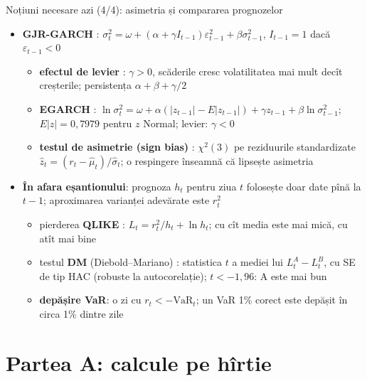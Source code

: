 \begin{frame}{Noțiuni necesare azi (4/4): asimetria și compararea prognozelor}
\itemsize{\small}
\begin{itemize}
    \item \textbf{GJR-GARCH} : $\sigma_t^2 = \omega + (\alpha + \gamma I_{t-1})\varepsilon_{t-1}^2 + \beta\sigma_{t-1}^2$, $I_{t-1} = 1$ dacă $\varepsilon_{t-1} < 0$
    \begin{itemize}
        \item \textbf{efectul de levier} : $\gamma > 0$, scăderile cresc volatilitatea mai mult decît creșterile; persistența $\alpha + \beta + \gamma/2$
        \item \textbf{EGARCH} : $\ln\sigma_t^2 = \omega + \alpha(|z_{t-1}| - E|z_{t-1}|) + \gamma z_{t-1} + \beta\ln\sigma_{t-1}^2$; $E|z| = 0{,}7979$ pentru $z$ Normal; levier: $\gamma < 0$
        \item \textbf{testul de asimetrie (sign bias)} : $\chi^2(3)$ pe reziduurile standardizate $\hat z_t = (r_t - \hat\mu_t)/\hat\sigma_t$; o respingere înseamnă că lipsește asimetria
    \end{itemize}
    \item \textbf{În afara eșantionului}: prognoza $h_t$ pentru ziua $t$ folosește doar date pînă la $t-1$; aproximarea varianței adevărate este $r_t^2$
    \begin{itemize}
        \item pierderea \textbf{QLIKE} : $L_t = r_t^2/h_t + \ln h_t$; cu cît media este mai mică, cu atît mai bine
        \item testul \textbf{DM} (Diebold--Mariano) : statistica $t$ a mediei lui $L_t^A - L_t^B$, cu SE de tip HAC (robuste la autocorelație); $t < -1{,}96$: A este mai bun
        \item \textbf{depășire VaR}: o zi cu $r_t < -\mathrm{VaR}_t$; un VaR 1\% corect este depășit în circa 1\% dintre zile
    \end{itemize}
\end{itemize}
\end{frame}


\section{Partea A: calcule pe hîrtie}

